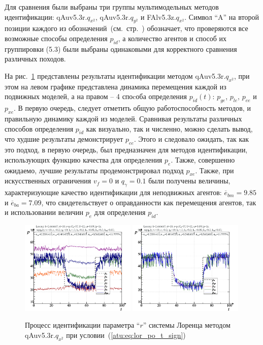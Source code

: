 Для сравнения были выбраны три группы мультимодельных методов идентификации:
qAuv5.3r.$q_{x^2}$,
qAuv5.3r.$q_{y^2}$ и
FAlv5.3z.$q_{x^2}$. Символ ``A'' на второй позиции каждого из
обозначений~(см.~стр.~\pageref{atu:id_classification})
обозначает, что проверяются
все возможные способы определения $p_{id}$,
а количество агентов и способ их группировки (5.3) были выбраны
одинаковыми для корректного сравнения различных походов.


На рис.~\ref{atu:f:lor_id_qAuv5.3r.q_x2_sign} представлены результаты идентификации
методом qAuv5.3r.$q_{x^2}$, при этом на левом графике представлена
динамика перемещения каждой из подвижных моделей,
а на правом -- 4 споcоба определения $p_{id}(t)$:
$p_{ge}$, $p_{le}$, $p_{ee}$ и $p_{xe}$.
В первую очередь, следует отметить общую работоспособность
методов, и правильную динамику каждой из моделей.
Сравнивая результаты различных способов определения
$p_{id}$ как визуально, так и численно, можно сделать
вывод, что худшие результаты демонстрирует $p_{ee}$.
Этого и следовало ожидать, так как это подход, в первую очередь,
был предназначен для методов идентификации, использующих
функцию качества для определения $p_e$.
Также, совершенно ожидаемо, лучшие результаты продемонстрировал
подход $p_{xe}$. Также, при искусственных ограничения
$v_f=0$ и $q_\gamma=0.1$ были получены величины,
характеризующие качество идентификации для неподвижных агентов:
$\overline{e}_{bm}=9.85$
и
$\overline{e}_{ba}=7.09$, что свидетельствует
о оправданности как перемещения агентов,
так и использовании величин $p_e$ для определения $p_{id}$.



\begin{figure}[h!]
  \centerline{
    \includegraphics[width=0.49\textwidth]{p/cha/lor/qAuv5.3r/lor_qAuv5_3r_qy2-p_t_pi_sign.png}
    \hfill
    \includegraphics[width=0.49\textwidth]{p/cha/lor/qAuv5.3r/lor_qAuv5_3r_qy2-p_t_pz_sign.png}
  }
  \caption{Процесс идентификации параметра ``$r$'' системы Лоренца методом qAuv5.3r.$q_{x^2}$ при условии~(\ref{atu:eq:lor_po_t_sign})}
  \label{atu:f:lor_id_qAuv5.3r.q_x2_sign}
\end{figure}


